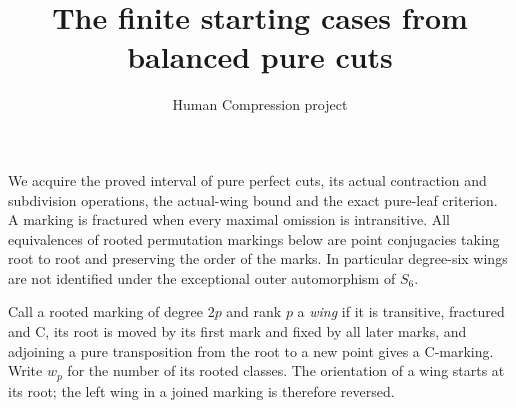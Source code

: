 \documentclass[11pt,a4paper]{article}
\title{The finite starting cases from balanced pure cuts}
\author{Human Compression project}\date{}
\begin{document}
\maketitle
We acquire the proved interval of pure perfect cuts, its actual
contraction and subdivision operations, the actual-wing bound and the
exact pure-leaf criterion. A marking is fractured when every maximal
omission is intransitive. All equivalences of rooted permutation
markings below are point conjugacies taking root to root and preserving
the order of the marks. In particular degree-six wings are not
identified under the exceptional outer automorphism of $S_6$.

Call a rooted marking of degree $2p$ and rank $p$ a \emph{wing} if it is
transitive, fractured and C, its root is moved by its first mark and fixed
by all later marks, and adjoining a pure transposition from the root to
a new point gives a C-marking. Write $w_p$ for the number of its rooted
classes. The orientation of a wing starts at its root; the left wing in
a joined marking is therefore reversed.
\end{document}
